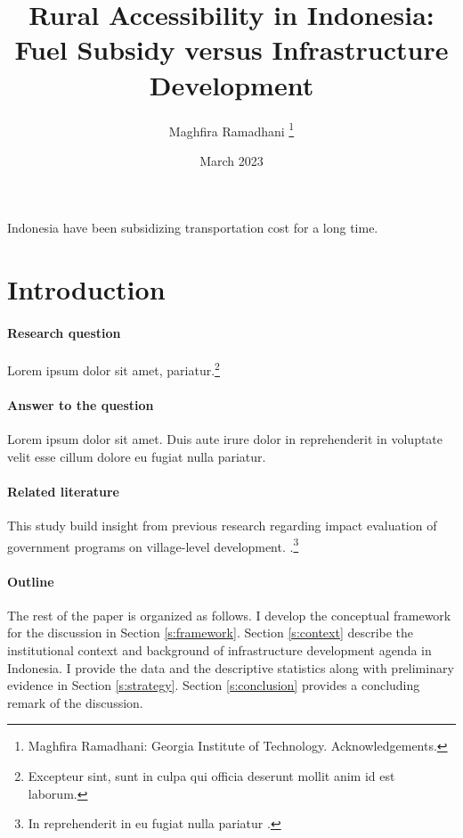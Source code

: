 \documentclass[letterpaper,12pt,leqno]{article}
\begin{document}
\title{Rural Accessibility in Indonesia: Fuel Subsidy versus Infrastructure Development}
\author{Maghfira Ramadhani
\thanks{Maghfira Ramadhani: Georgia Institute of Technology. Acknowledgements.}}
\date{March 2023}                       
\begin{titlepage}\maketitle

Indonesia have been subsidizing transportation cost for a long time.

\end{titlepage}\section{Introduction}\label{s:introduction}
 
\paragraph{Research question} Lorem ipsum dolor sit amet,  pariatur.\footnote{Excepteur sint, sunt in culpa qui officia deserunt mollit anim id est laborum.}

\paragraph{Answer to the question} Lorem ipsum dolor sit amet. Duis aute irure dolor in reprehenderit in voluptate velit esse cillum dolore eu fugiat nulla pariatur. 

\paragraph{Related literature} This study build insight from previous research regarding impact evaluation of government programs on village-level development. \citet{asher_2020} .\footnote{In reprehenderit in eu fugiat nulla pariatur \citep{LMS18a}.}


\paragraph{Outline} The rest of the paper is organized as follows. I develop the conceptual framework for the discussion in Section \ref{s:framework}. Section \ref{s:context} describe the institutional context and background of infrastructure development agenda in Indonesia. I provide the data and the descriptive statistics along with preliminary evidence in Section \ref{s:strategy}. Section \ref{s:conclusion} provides a concluding remark of the discussion.
\end{document}
